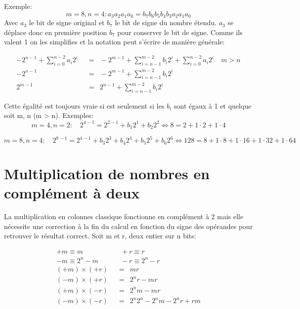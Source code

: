 Exemple:
\[m =8, n=4: a_3 a_2 a_1 a_0 = b_7 b_6 b_5 b_4 b_3 a_2 a_1 a_0 \]
Avec $a_3$ le bit de signe original et $b_7$ le bit de signe du nombre étendu. $a_3$ se déplace donc en première position $b_7$ pour conserver le bit de signe. Comme ils valent 1 on les simplifies et la notation peut s'écrire de manière générale:

\begin{equation}
\begin{aligned}
-2^{n-1} + \sum_{i=0}^{n-2}a_i 2^i \enspace &= \enspace -2^{m-1} + \sum_{i=n-1}^{m-2} b_{i}2^{i} + \sum_{i=0}^{n-2}a_i 2^i  \quad m > n\\
-2^{n-1} \enspace &= \enspace -2^{m-1} + \sum_{i=n-1}^{m-2} b_{i}2^{i} \\
2^{m-1} \enspace &= \enspace 2^{n-1} + \sum_{i=n-1}^{m-2} b_{i}2^{i}
\end{aligned}
\end{equation}

Cette égalité est toujours vraie si est seulement si les $b_i$ sont égaux à 1 et quelque soit m, n (m > n). Exemples:
\[
m=4, n=2: \quad 2^{4-1} = 2^{2-1} + b_1 2^{1} + b_2 2^{2} \Leftrightarrow 8 = 2 + 1 \cdot 2 + 1 \cdot 4
\]

\[
m=8, n=4: \quad 2^{8-1} = 2^{4-1} + b_3 2^{3} + b_4 2^{4} + b_5 2^{5} + b_6 2^{6}\Leftrightarrow 128 = 8 + 1 \cdot 8 + 1 \cdot 16 + 1 \cdot 32 + 1 \cdot 64
\]

\section{Multiplication de nombres en complément à deux}
La multiplication en colonnes classique fonctionne en complément à 2 mais elle nécessite une correction à la fin du calcul en fonction du signe des opérandes pour retrouver le résultat correct. Soit m et r, deux entier sur n bits:

\begin{equation}
\begin{aligned}
+m \equiv m \enspace & \enspace +r \equiv r\\
-m \equiv 2^n-m \enspace & \enspace -r \equiv 2^n-r\\
(+m) \times (+r) \enspace &= \enspace mr\\
(-m) \times (+r) \enspace &= \enspace 2^{n}r - mr\\
(+m) \times (-r) \enspace &= \enspace 2^{n}m - mr\\
(-m) \times (-r) \enspace &= \enspace 2^{n}2^{n} - 2^{n}m - 2^{n}r + rm
\end{aligned}
\end{equation}

